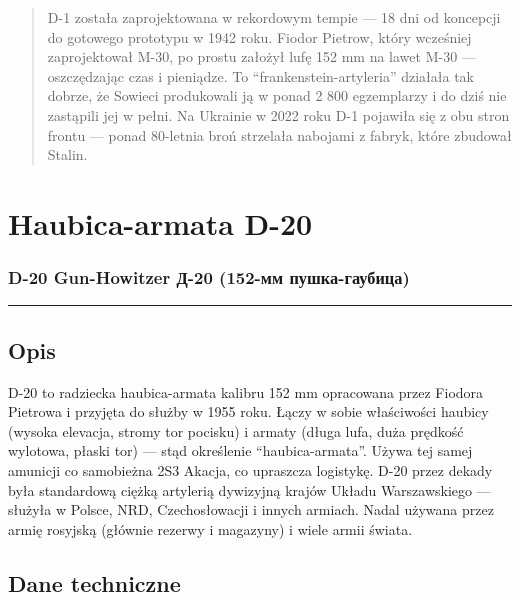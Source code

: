 \documentclass[12pt,openany,oneside]{book}
\begin{document}
\begin{quote}
D-1 została zaprojektowana w rekordowym tempie --- 18 dni od koncepcji
do gotowego prototypu w 1942 roku. Fiodor Pietrow, który wcześniej
zaprojektował M-30, po prostu założył lufę 152 mm na lawet M-30 ---
oszczędzając czas i pieniądze. To ``frankenstein-artyleria'' działała
tak dobrze, że Sowieci produkowali ją w ponad 2 800 egzemplarzy i do
dziś nie zastąpili jej w pełni. Na Ukrainie w 2022 roku D-1 pojawiła się
z obu stron frontu --- ponad 80-letnia broń strzelała nabojami z fabryk,
które zbudował Stalin.
\end{quote}

\chapter{Haubica-armata D-20}\label{haubica-armata-d-20}

\subsection{D-20 Gun-Howitzer \textbar{} Д-20 (152-мм
пушка-гаубица)}\label{d-20-gun-howitzer-ux434-20-152-ux43cux43c-ux43fux443ux448ux43aux430-ux433ux430ux443ux431ux438ux446ux430}

\begin{center}\rule{0.5\linewidth}{0.5pt}\end{center}

\section{Opis}\label{opis-20}

D-20 to radziecka haubica-armata kalibru 152 mm opracowana przez Fiodora
Pietrowa i przyjęta do służby w 1955 roku. Łączy w sobie właściwości
haubicy (wysoka elevacja, stromy tor pocisku) i armaty (długa lufa, duża
prędkość wylotowa, płaski tor) --- stąd określenie ``haubica-armata''.
Używa tej samej amunicji co samobieżna 2S3 Akacja, co upraszcza
logistykę. D-20 przez dekady była standardową ciężką artylerią dywizyjną
krajów Układu Warszawskiego --- służyła w Polsce, NRD, Czechosłowacji i
innych armiach. Nadal używana przez armię rosyjską (głównie rezerwy i
magazyny) i wiele armii świata.

\section{Dane techniczne}\label{dane-techniczne-20}
\end{document}
